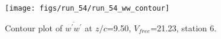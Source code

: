 \begin{figure}[H]
\centering
\texttt{[image: figs/run\_54/run\_54\_ww\_contour]}
\caption{Contour plot of $\overline{w^\prime w^\prime}$ at $z/c$=9.50, $V_{free}$=21.23, station 6.}
\end{figure}


